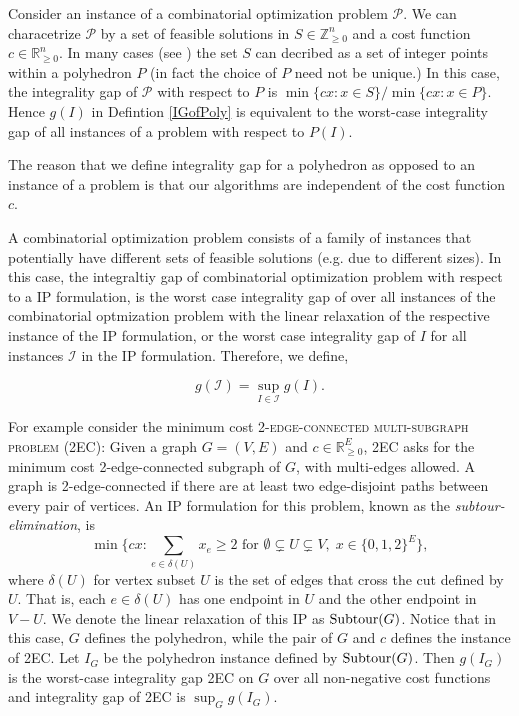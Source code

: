 Consider an instance of a combinatorial optimization problem $\mathcal{P}$. We can characetrize $\mathcal{P}$ by a set of feasible solutions in $S\in \mathbb{Z}_{\geq 0}^n$ and a cost function $c\in \mathbb{R}_{\geq 0}^n$. In many cases (see \cite{vazirani,shmoyswilliamson}) the set $S$ can decribed as a set of integer points within a polyhedron $P$ (in fact the choice of $P$ need not be unique.) In this case, the integrality gap of $\mathcal{P}$ with respect to $P$ is $\min\{cx:x\in S\}/{\min\{cx:x\in P\}}$. Hence $g(I)$ in Defintion \ref{IGofPoly} is equivalent to the worst-case integrality gap of all instances of a problem with respect to $P(I)$. 

The reason that we define integrality gap for a polyhedron as opposed to an instance of a problem is that our algorithms are independent of the cost function $c$. 
 
A combinatorial optimization problem consists of a family of instances that potentially have different sets of feasible solutions (e.g. due to different sizes). In this case, the integraltiy gap of combinatorial optimization problem with respect to a IP formulation, is the worst case integrality gap of over all instances of the combinatorial optmization problem with the linear relaxation of the respective instance of the IP formulation, or the worst case integrality gap of $I$ for all instances $\mathcal{I}$ in the IP formulation. Therefore, we define,
 
\begin{equation}\label{gapproblem}
g(\mathcal{I}) = \sup_{I\in\mathcal{I}}g(I).
\end{equation}

For example consider the minimum cost \textsc{2-edge-connected multi-subgraph problem (2EC)}: Given a graph $G=(V,E)$ and $c\in \mathbb{R}^E_{\geq 0}$, 2EC asks for the minimum cost 2-edge-connected subgraph of $G$, with multi-edges allowed. A graph is 2-edge-connected if there are at least two edge-disjoint paths between every pair of vertices.  An IP formulation for this problem, known as the {\em subtour-elimination}, is
 \begin{equation}\min \{cx: \sum_{e\in \delta(U)}x_e \geq 2 \mbox{ for } \emptyset \subsetneq U \subsetneq V,\; x\in \{0,1,2\}^{E}\}, 
 \label{eq:subtour}
 \end{equation}
where $\delta(U)$ for vertex subset $U$ is the set of edges that cross the cut defined by $U$.  That is, each $e \in \delta(U)$ has one endpoint in $U$ and the other endpoint in $V-U$. We denote the linear relaxation of this IP as $\operatorname{{Subtour}}(G)$. Notice that in this case, $G$ defines the polyhedron, while the pair of $G$ and $c$ defines the instance of 2EC. Let $I_G$ be the polyhedron instance defined by $\operatorname{{Subtour}}(G)$. Then $g(I_G)$ is the worst-case integrality gap 2EC on $G$ over all non-negative cost functions and integrality gap of 2EC is $\sup_{G} g(I_G)$. 



